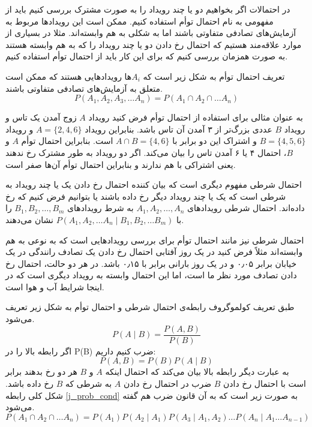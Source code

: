 در احتمالات اگر بخواهیم دو یا چند رویداد را به صورت مشترک بررسی کنیم باید از مفهومی به نام احتمال توأم استفاده کنیم. ممکن است این رویداد‌ها مربوط به آزمایش‌های تصادفی متفاوتی باشند اما به شکلی به هم وابسته‌اند. مثلا در بسیاری از موارد علاقه‌مند هستیم که احتمال رخ دادن دو یا چند رویداد را که به هم وابسته هستند به صورت همزمان بررسی کنیم که برای این کار باید از احتمال توأم استفاده کنیم.

تعریف احتمال توأم به شکل زیر است که $A_i$ها رویدادهایی هستند که ممکن است متعلق به ‌آزمایش‌های تصادفی متفاوتی باشند.
\begin{equation}
    P(A_1,A_2,A_3,\dotsc A_n) = P(A_1\cap A_2 \cap\dotsc A_n) 
    \label{eq5:cond_prob}
\end{equation}

به عنوان مثالی برای استفاده از احتمال توأم فرض کنید رویداد $A$ زوج آمدن یک تاس و رویداد $B$ عددی بزرگ‌تر از ۳ آمدن آن تاس باشد. بنابراین رویداد $A =\{2,4,6\}$ و رویداد $B = \{4,5,6\}$ و اشتراک این دو برابر با $A\cap B=\{4,6\}$ است. بنابراین احتمال توأم $A$ و $B$، احتمال ۴ یا ۶ آمدن تاس را بیان می‌کند. اگر دو رویداد به طور مشترک رخ ندهند یعنی اشتراکی با هم ندارند و بنابراین احتمال توأم آن‌ها صفر است.

احتمال شرطی مفهوم دیگری است که بیان کننده احتمال رخ دادن یک یا چند رویداد به شرطی است که یک یا چند رویداد دیگر رخ داده باشند یا بتوانیم فرض کنیم که رخ داده‌اند. احتمال شرطی رویدادهای $A_1, A_2,\dotsc ,A_n$ به شرط رویدادهای $B_1, B_2, \dotsc , B_m$ را با $P(A_1, A_2, \dotsc A_n \mid B_1,B_2,\dotsc B_m)$ نشان می‌دهند.

احتمال شرطی نیز مانند احتمال توأم برای بررسی رویدادهایی است که به نوعی به هم وابسته‌اند مثلاً فرض کنید در یک روز آفتابی  احتمال رخ دادن یک تصادف رانندگی در یک خیابان برابر ۰٫۰۵ و در یک روز بارانی برابر با ۰٫۱۵ باشد. در هر دو حالت، احتمال رخ دادن تصادف مورد نظر ما است، اما این احتمال وابسته به رویداد دیگری است که در اینجا شرایط آب و هوا است.

طبق تعریف کولموگروف رابطه‌ی احتمال شرطی و احتمال توأم به شکل زیر تعریف می‌شود.
\begin{equation}
    P(A \mid B) = \frac{P(A,B)}{P(B)}
    \label{cond_prob_j}
\end{equation}
اگر رابطه بالا را در P(B) ضرب کنیم داریم:
\begin{equation}
    P(A,B)=P(B)P(A \mid B)
    \label{j_prob_cond}
\end{equation}
به عبارت دیگر رابطه بالا بیان می‌کند که احتمال اینکه $A$ و $B$ هر دو رخ بدهند برابر است با احتمال رخ دادن $B$ ضرب در احتمال رخ دادن $A$ به شرطی که $B$ رخ داده باشد. شکل کلی رابطه \ref{j_prob_cond} به صورت زیر است که به آن قانون ضرب هم گفته می‌شود.
\begin{equation}
    P(A_1\cap A_2 \cap \dotsc A_n) = P(A_1)P(A_2 \mid A_1)P(A_3 \mid A_1,A_2) \dotsc P(A_n \mid A_1 \dotsc A_{n-1})
    \label{eq8:mult_rule}
\end{equation}

